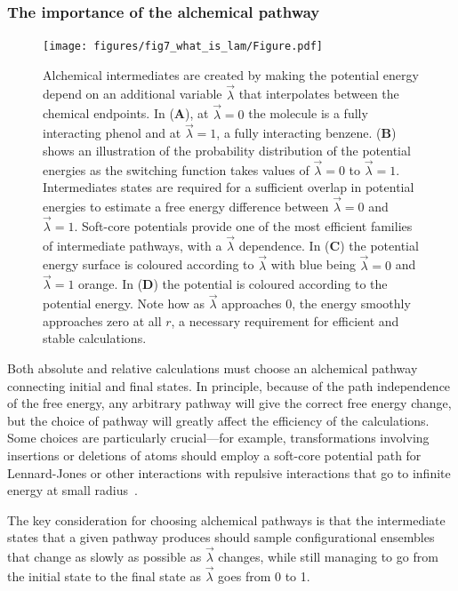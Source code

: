 \documentclass[9pt,bestpractices]{livecoms}
\begin{document}
\subsubsection{The importance of the alchemical pathway
\label{sec:important_path}}
\begin{figure}
    \texttt{[image: figures/fig7\_what\_is\_lam/Figure.pdf]}
    \caption{Alchemical intermediates are created by making the potential energy depend on an additional variable $\vec{\lambda}$ that interpolates between the chemical endpoints. In (\textbf{A}), at $\vec{\lambda}=0$ the molecule is a fully interacting phenol and at $\vec{\lambda}=1$,  a fully interacting benzene. (\textbf{B}) shows an illustration of the probability distribution of the potential energies as the switching function takes values of $\vec{\lambda}=0$ to $\vec{\lambda}=1$. Intermediates states are required for a sufficient overlap in potential energies to estimate a free energy difference between $\vec{\lambda}=0$ and $\vec{\lambda}=1$.
    Soft-core potentials provide one of the most efficient families of intermediate pathways, with a $\vec{\lambda}$ dependence. In (\textbf{C}) the potential energy surface is coloured according to $\vec{\lambda}$ with blue being $\vec{\lambda}=0$ and $\vec{\lambda}=1$ orange. In (\textbf{D}) the potential is coloured according to the potential energy. Note how as $\vec{\lambda}$ approaches 0, the energy smoothly approaches zero at all $r$, a necessary requirement for efficient and stable calculations.  }
    \label{fig:fig_what_is_lambda}
\end{figure}

Both absolute and relative calculations must choose an alchemical pathway connecting initial and final states. In principle, because of the path independence of the free energy, any arbitrary pathway will give the correct free energy change, but the choice of pathway will greatly affect the efficiency of the calculations. Some choices are particularly crucial---for example, transformations involving insertions or deletions of atoms should employ a soft-core potential path for Lennard-Jones or other interactions with repulsive interactions that go to infinite energy at small radius~\cite{beutler1994avoiding, beutler1994molecular,gapsys2012new}.

The key consideration for choosing alchemical pathways is that the intermediate states that a given pathway produces should sample configurational ensembles that change as slowly as possible as $\vec{\lambda}$ changes, while still managing to go from the initial state to the final state as $\vec{\lambda}$ goes from 0 to 1.
\end{document}
